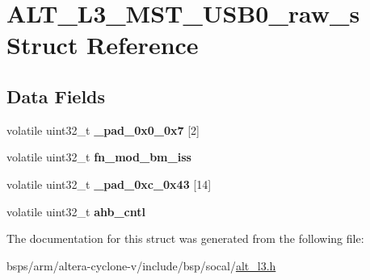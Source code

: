 \hypertarget{structALT__L3__MST__USB0__raw__s}{}\section{A\+L\+T\+\_\+\+L3\+\_\+\+M\+S\+T\+\_\+\+U\+S\+B0\+\_\+raw\+\_\+s Struct Reference}
\label{structALT__L3__MST__USB0__raw__s}
\subsection*{Data Fields}
\begin{DoxyCompactItemize}
\item 
\mbox{\label{structALT__L3__MST__USB0__raw__s_a5e652b7903118a6c719ae717ea2b6a51}} 
volatile uint32\+\_\+t {\bfseries \+\_\+pad\+\_\+0x0\+\_\+0x7} \mbox{[}2\mbox{]}
\item 
\mbox{\label{structALT__L3__MST__USB0__raw__s_af62c45a65cf607028d3a30fa7b93443f}} 
volatile uint32\+\_\+t {\bfseries fn\+\_\+mod\+\_\+bm\+\_\+iss}
\item 
\mbox{\label{structALT__L3__MST__USB0__raw__s_a16c7833a8de10b23f9952851f644fdef}} 
volatile uint32\+\_\+t {\bfseries \+\_\+pad\+\_\+0xc\+\_\+0x43} \mbox{[}14\mbox{]}
\item 
\mbox{\label{structALT__L3__MST__USB0__raw__s_aa532ea72b458fbcf0395ad0dd79d54e0}} 
volatile uint32\+\_\+t {\bfseries ahb\+\_\+cntl}
\end{DoxyCompactItemize}


The documentation for this struct was generated from the following file\+:\begin{DoxyCompactItemize}
\item 
bsps/arm/altera-\/cyclone-\/v/include/bsp/socal/\mbox{\hyperlink{alt__l3_8h}{alt\+\_\+l3.\+h}}\end{DoxyCompactItemize}
